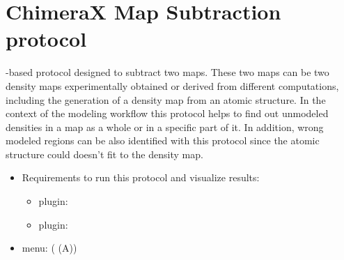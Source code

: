 \section{ChimeraX Map Subtraction protocol}
\label{app:chimeraMapSubtraction}%

\chimera-based protocol designed to subtract two maps. These two maps can be two density maps experimentally obtained or derived from different computations, including the generation of a density map from an atomic structure. In the context of the \scipion modeling workflow this protocol helps to find out unmodeled densities in a map as a whole or in a specific part of it. In addition, wrong modeled regions can be also identified with this protocol since the atomic structure could doesn't fit to the density map.  
   
 \begin{itemize}
  \item Requirements to run this protocol and visualize results:
    \begin{itemize}
        \item \scipion plugin: 
        \item \scipion plugin: 
    \end{itemize}
  \item \scipion menu:
   ( (A))
  

\end{itemize}
